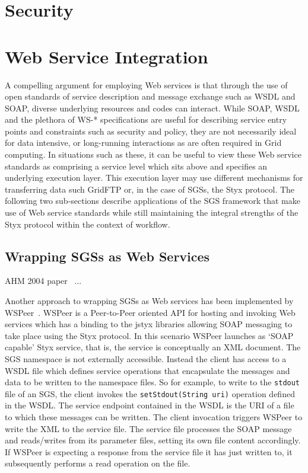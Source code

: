 \documentclass{llncs}
\begin{document}
\section{Security}
%

\section{Web Service Integration}
\label{sec:webservices}

A compelling argument for employing Web services is that through the use of open standards of service description and message exchange such as WSDL and SOAP, diverse underlying resources and codes can interact. While SOAP, WSDL and the plethora of WS-* specifications are useful for describing service entry points and constraints such as security and policy, they are not necessarily ideal for data intensive, or long-running interactions as are often required in Grid computing. In situations such as these, it can be useful to view these Web service standards as comprising a service level which sits above and specifies an underlying execution layer. This execution layer may use different mechanisms for transferring data such GridFTP or, in the case of SGSs, the Styx protocol. The following two sub-sections describe applications of the SGS framework that make use of Web service standards while still maintaining the integral strengths of the Styx protocol within the context of workflow.

\subsection{Wrapping SGSs as Web Services}
AHM 2004 paper~\cite{blower:2004} ...

Another approach to wrapping SGSs as Web services has been implemented by WSPeer~\cite{wspeer}. WSPeer is a Peer-to-Peer oriented API for hosting and invoking Web services which has a binding to the jstyx libraries allowing SOAP messaging to take place using the Styx protocol. In this scenario WSPeer launches as `SOAP capable' Styx service, that is, the service is conceptually an XML document. The SGS namespace is not externally accessible. Instead the client has access to a WSDL file which defines service operations that encapsulate the messages and data to be written to the namespace files. So for example, to write to the \texttt{stdout} file of an SGS, the client invokes the \texttt{setStdout(String uri)} operation defined in the WSDL. The service endpoint contained in the WSDL is the URI of a file to which these messages can be written. The client invocation triggers WSPeer to write the XML to the service file. The service file processes the SOAP message and reads/writes from its parameter files, setting its own file content accordingly. If WSPeer is expecting a response from the service file it has just written to, it subsequently performs a read operation on the file.
\end{document}

